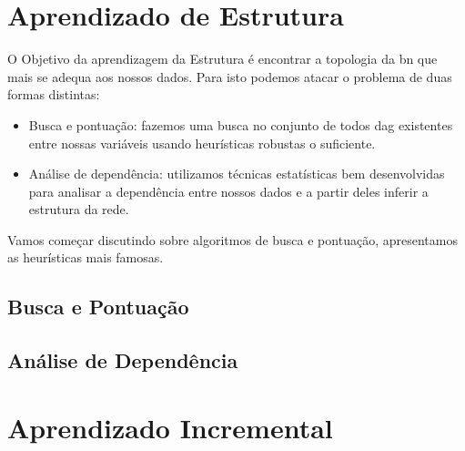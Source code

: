 \section{Aprendizado de Estrutura}
O Objetivo da aprendizagem da Estrutura é encontrar a topologia da \gls{bn} que mais se adequa aos nossos dados. Para isto podemos atacar o problema de duas formas distintas:
\begin{itemize}
	\item Busca e pontuação: fazemos uma busca no conjunto de todos \gls{dag} existentes entre nossas variáveis usando heurísticas robustas o suficiente.
	\item Análise de dependência: utilizamos técnicas estatísticas bem desenvolvidas para analisar a dependência entre nossos dados e a partir deles inferir a estrutura da rede.
\end{itemize}

Vamos começar discutindo sobre algoritmos de busca e pontuação, apresentamos as heurísticas mais famosas.

\subsection{Busca e Pontuação}



\subsection{Análise de Dependência}

\section{Aprendizado Incremental}